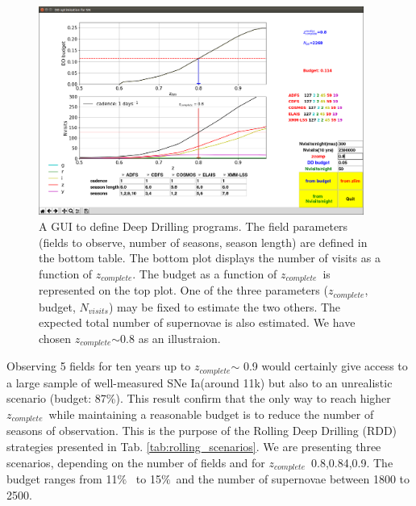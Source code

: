 \documentclass[\docopts]{\docclass}
\newcommand{\sne}{{SNe Ia}}
\newcommand{\zcomp}{\mbox{$z_{complete}$}}
\newcommand{\per}{$\%$}
\newcommand{\nvisits}{$N_{visits}$}
\begin{document}
\begin{figure}[htbp]
\begin{center}
  \includegraphics[width=0.95\textwidth]{budget_GUI.png}
 \caption{A GUI to define Deep Drilling programs. The field parameters (fields to observe, number of seasons, season length) are defined in the bottom table. The bottom plot displays the number of visits as a function of \zcomp. The budget as a function of \zcomp~is represented on the top plot. One of the three parameters (\zcomp, budget, \nvisits) may be fixed to estimate the two others. The expected total number of supernovae is also estimated. We have chosen \zcomp$\sim$0.8 as an illustraion.}\label{fig:budget_gui}
\end{center}
\end{figure}
Observing 5 fields for ten years up to \zcomp$\sim$ 0.9 would certainly give access to a large sample of well-measured \sne (around 11k) but also to an unrealistic scenario (budget: 87\%). This result confirm that the only way to reach higher \zcomp~while maintaining a reasonable budget is to reduce the number of seasons of observation. This is the purpose of the Rolling Deep Drilling (RDD) strategies presented in Tab. \ref{tab:rolling_scenarios}. We are presenting three scenarios, depending on the number of fields and for \zcomp~0.8,0.84,0.9. The budget ranges from 11\per~ to 15\per~and the number of supernovae between 1800 to 2500.
\end{document}
